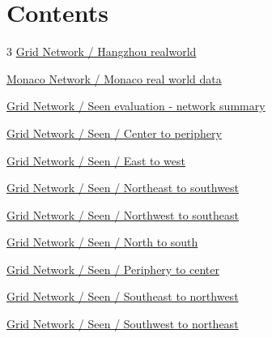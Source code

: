 \documentclass[11pt]{article}
\begin{document}
\newpage
{}\section*{Contents}\begin{multicols}{3}\small
\noindent\hyperref[real-grid]{Grid Network / Hangzhou realworld}\hfill\pageref*{real-grid}\par\vspace{3pt}
\noindent\hyperref[real-monaco]{Monaco Network / Monaco real world data}\hfill\pageref*{real-monaco}\par\vspace{3pt}
\noindent\hyperref[seen-grid-summary]{Grid Network / Seen evaluation - network summary}\hfill\pageref*{seen-grid-summary}\par\vspace{3pt}
\noindent\hyperref[seen-grid-seen_Center_to_Periphery]{Grid Network / Seen / Center to periphery}\hfill\pageref*{seen-grid-seen_Center_to_Periphery}\par\vspace{3pt}
\noindent\hyperref[seen-grid-seen_E_to_W]{Grid Network / Seen / East to west}\hfill\pageref*{seen-grid-seen_E_to_W}\par\vspace{3pt}
\noindent\hyperref[seen-grid-seen_NE_to_SW]{Grid Network / Seen / Northeast to southwest}\hfill\pageref*{seen-grid-seen_NE_to_SW}\par\vspace{3pt}
\noindent\hyperref[seen-grid-seen_NW_to_SE]{Grid Network / Seen / Northwest to southeast}\hfill\pageref*{seen-grid-seen_NW_to_SE}\par\vspace{3pt}
\noindent\hyperref[seen-grid-seen_N_to_S]{Grid Network / Seen / North to south}\hfill\pageref*{seen-grid-seen_N_to_S}\par\vspace{3pt}
\noindent\hyperref[seen-grid-seen_Periphery_to_Center]{Grid Network / Seen / Periphery to center}\hfill\pageref*{seen-grid-seen_Periphery_to_Center}\par\vspace{3pt}
\noindent\hyperref[seen-grid-seen_SE_to_NW]{Grid Network / Seen / Southeast to northwest}\hfill\pageref*{seen-grid-seen_SE_to_NW}\par\vspace{3pt}
\noindent\hyperref[seen-grid-seen_SW_to_NE]{Grid Network / Seen / Southwest to northeast}\hfill\pageref*{seen-grid-seen_SW_to_NE}\par\vspace{3pt}

\end{multicols}
\end{document}
